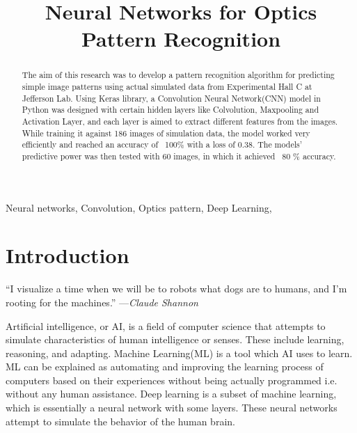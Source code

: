 \documentclass[conference]{IEEEtran}
\begin{document}

\title{Neural Networks for Optics Pattern Recognition
}

\author{
} 

\maketitle

\thispagestyle{plain}
\pagestyle{plain}
\begin{abstract}
The aim of this research was to develop a pattern recognition algorithm for predicting
simple image patterns using actual simulated data from Experimental Hall C at Jefferson Lab. 
Using Keras library, a Convolution Neural Network(CNN) model in Python was designed with certain hidden layers like Colvolution, Maxpooling and Activation Layer, and each layer is aimed to extract different features from the images.
While training it against 186 images of simulation data, the model worked very efficiently and reached an accuracy of ~100\% with a loss of 0.38. The models' predictive power was then tested with 60 images, in which it achieved ~80 \% accuracy.\\
\end{abstract}

\begin{IEEEkeywords}
Neural networks, Convolution, Optics pattern, Deep Learning, 
\end{IEEEkeywords}

\section{\textbf{Introduction}}

“I visualize a time when we will be to robots what dogs are to humans, and I’m rooting for the machines.” —\emph{Claude Shannon}

Artificial intelligence, or AI, is a field of computer science that attempts to simulate characteristics of human intelligence or senses. These include learning, reasoning, and adapting. 
Machine Learning(ML) is a tool which AI uses to learn. ML can be explained as automating and improving the learning process of computers based on their experiences without being actually programmed i.e. without any human assistance.
Deep learning is a subset of machine learning, which is essentially a neural network with some layers. These neural networks attempt to simulate the behavior of the human brain.
\end{document}
